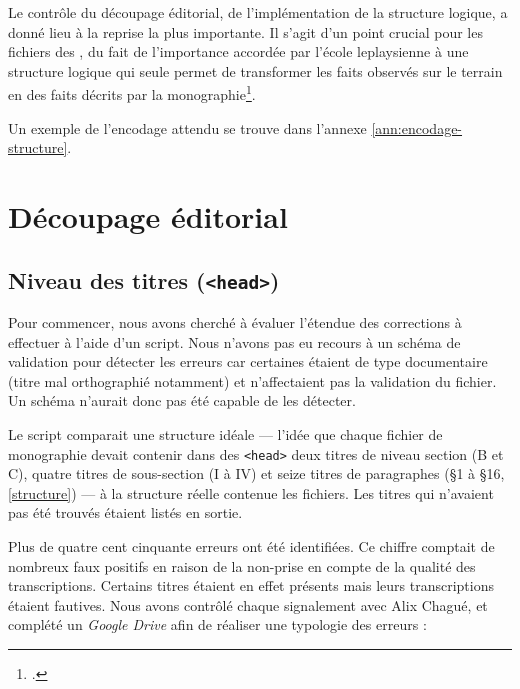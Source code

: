 Le contrôle du découpage éditorial, \cad{} de l'implémentation de la structure logique, a donné lieu à la reprise la plus importante. Il s'agit d'un point crucial pour les fichiers des \odm, du fait de l'importance accordée par l'école leplaysienne à une structure logique qui seule permet de transformer les \og faits observés \fg{} sur le terrain en des \og faits décrits \fg{} par la monographie\footcite[p. 87]{baciocchi2}.

Un exemple de l'encodage attendu se trouve dans l'annexe \ref{ann:encodage-structure}.

\section{Découpage éditorial}

\subsection{Niveau des titres (\texttt{<head>})}

Pour commencer, nous avons cherché à évaluer l'étendue des corrections à effectuer à l'aide d'un script. Nous n'avons pas eu recours à un schéma de validation pour détecter les erreurs car certaines étaient de type documentaire (titre mal orthographié notamment) et n'affectaient pas la validation du fichier. Un schéma n'aurait donc pas été capable de les détecter.

Le script comparait une structure idéale --- \cad{} l'idée que chaque fichier de monographie devait contenir dans des \texttt{<head>} deux titres de niveau section (B et C), quatre titres de sous-section (I à IV) et seize titres de paragraphes (§1 à §16, \cf{} \ann{} \ref{structure}) --- à la structure réelle contenue les fichiers. Les titres qui n'avaient pas été trouvés étaient listés en sortie.

Plus de quatre cent cinquante erreurs ont été identifiées. Ce chiffre comptait de nombreux faux positifs en raison de la non-prise en compte de la qualité des transcriptions. Certains titres étaient en effet présents mais leurs transcriptions étaient fautives. Nous avons contrôlé chaque signalement avec Alix Chagué, et complété un \textit{Google Drive} afin de réaliser une typologie des erreurs :


